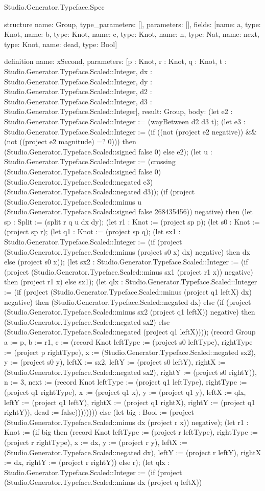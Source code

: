 \begin{lexlean}{Studio.Generator.Typeface.Spec}
\begin{semanticmodule}
structure{
  name: Group,
  type_parameters: [],
  parameters: [],
  fields: [{name: a, type: Knot}, {name: b, type: Knot}, {name: c, type: Knot}, {name: n, type: Nat}, {name: next, type: Knot}, {name: dead, type: Bool}]
}

definition{
  name: xSecond,
  parameters: [p : Knot, r : Knot, q : Knot, t : Studio.Generator.Typeface.Scaled::Integer, dx : Studio.Generator.Typeface.Scaled::Integer, dy : Studio.Generator.Typeface.Scaled::Integer, d2 : Studio.Generator.Typeface.Scaled::Integer, d3 : Studio.Generator.Typeface.Scaled::Integer],
  result: Group,
  body: (let e2 : Studio.Generator.Typeface.Scaled::Integer := (wayBetween d2 d3 t); (let e3 : Studio.Generator.Typeface.Scaled::Integer := (if ((not (project e2 negative)) && (not ((project e2 magnitude) =? 0))) then (Studio.Generator.Typeface.Scaled::signed false 0) else e2); (let u : Studio.Generator.Typeface.Scaled::Integer := (crossing (Studio.Generator.Typeface.Scaled::signed false 0) (Studio.Generator.Typeface.Scaled::negated e3) (Studio.Generator.Typeface.Scaled::negated d3)); (if (project (Studio.Generator.Typeface.Scaled::minus u (Studio.Generator.Typeface.Scaled::signed false 268435456)) negative) then (let sp : Split := (split r q u dx dy); (let r1 : Knot := (project sp p); (let s0 : Knot := (project sp r); (let q1 : Knot := (project sp q); (let sx1 : Studio.Generator.Typeface.Scaled::Integer := (if (project (Studio.Generator.Typeface.Scaled::minus (project s0 x) dx) negative) then dx else (project s0 x)); (let sx2 : Studio.Generator.Typeface.Scaled::Integer := (if (project (Studio.Generator.Typeface.Scaled::minus sx1 (project r1 x)) negative) then (project r1 x) else sx1); (let qlx : Studio.Generator.Typeface.Scaled::Integer := (if (project (Studio.Generator.Typeface.Scaled::minus (project q1 leftX) dx) negative) then (Studio.Generator.Typeface.Scaled::negated dx) else (if (project (Studio.Generator.Typeface.Scaled::minus sx2 (project q1 leftX)) negative) then (Studio.Generator.Typeface.Scaled::negated sx2) else (Studio.Generator.Typeface.Scaled::negated (project q1 leftX)))); (record Group {a := p, b := r1, c := (record Knot {leftType := (project s0 leftType), rightType := (project p rightType), x := (Studio.Generator.Typeface.Scaled::negated sx2), y := (project s0 y), leftX := sx2, leftY := (project s0 leftY), rightX := (Studio.Generator.Typeface.Scaled::negated sx2), rightY := (project s0 rightY)}), n := 3, next := (record Knot {leftType := (project q1 leftType), rightType := (project q1 rightType), x := (project q1 x), y := (project q1 y), leftX := qlx, leftY := (project q1 leftY), rightX := (project q1 rightX), rightY := (project q1 rightY)}), dead := false})))))))) else (let big : Bool := (project (Studio.Generator.Typeface.Scaled::minus dx (project r x)) negative); (let r1 : Knot := (if big then (record Knot {leftType := (project r leftType), rightType := (project r rightType), x := dx, y := (project r y), leftX := (Studio.Generator.Typeface.Scaled::negated dx), leftY := (project r leftY), rightX := dx, rightY := (project r rightY)}) else r); (let qlx : Studio.Generator.Typeface.Scaled::Integer := (if (project (Studio.Generator.Typeface.Scaled::minus dx (project q leftX)) }
\end{semanticmodule}
\end{lexlean}
